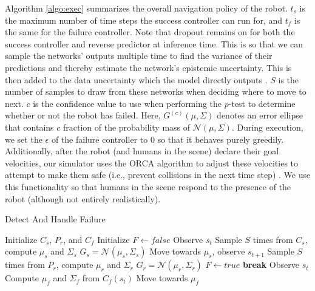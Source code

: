 \documentclass[letterpaper, 10 pt, conference]{ieeeconf}  %
\begin{document}
		Algorithm \ref{algo:exec} summarizes the overall navigation policy of the robot. $t_s$ is the maximum number of time steps the success controller can run for, and $t_f$ is the same for the failure controller. Note that dropout remains on for both the success controller and reverse predictor at inference time. This is so that we can sample the networks' outputs multiple time to find the variance of their predictions and thereby estimate the network's epistemic uncertainty. This is then added to the data uncertainty which the model directly outputs \cite{gal2016uncertainty}. $S$ is the number of samples to draw from these networks when deciding where to move to next. $c$ is the confidence value to use when performing the $p$-test to determine whether or not the robot has failed. Here, $G^{(c)}(\mu, \Sigma)$ denotes an error ellipse that contains $c$ fraction of the probability mass of $\mathcal{N}(\mu, \Sigma)$. During execution, we set the $\epsilon$ of the failure controller to $0$ so that it behaves purely greedily. Additionally, after the robot (and humans in the scene) declare their goal velocities, our simulator uses the ORCA algorithm to adjust these velocities to attempt to make them safe (i.e., prevent collisions in the next time step) \cite{orca}. We use this functionality so that humans in the scene respond to the presence of the robot (although not entirely realistically).
		
		\begin{algorithm}
			\caption{Detect And Handle Failure}
			\label{algo:exec}
			\begin{algorithmic}
					\State Initialize $C_s$, $P_r$, and $C_f$
					\State Initialize $F\leftarrow false$
						\State Observe $s_t$
						\State Sample $S$ times from $C_s$, compute $\mu_s$ and $\Sigma_s$
						\State $G_s = \mathcal{N}(\mu_s, \Sigma_s)$
						\State Move towards $\mu_s$, observe $s_{t+1}$
						\State Sample $S$ times from $P_r$, compute $\mu_r$ and $\Sigma_r$
						\State $G_r = \mathcal{N}(\mu_r, \Sigma_r)$
							\State $F\leftarrow true$
							\State \textbf{break}
						\EndIf
					\EndFor
							\State Observe $s_t$
							\State Compute $\mu_f$ and $\Sigma_f$ from $C_f(s_t)$
							\State Move towards $\mu_f$
						\EndFor
					\EndIf
				\EndFunction
			\end{algorithmic}
		\end{algorithm}
		
\end{document}
